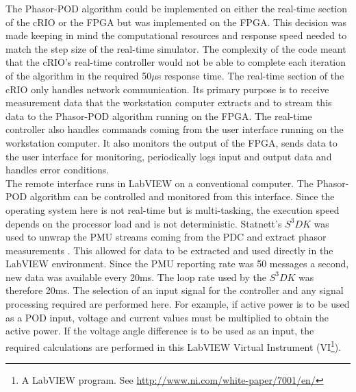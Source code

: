 \documentclass[journal]{IEEEtran}
\begin{document}
The Phasor-POD algorithm could be implemented on either the real-time section of the cRIO or the FPGA but was implemented on the FPGA. This decision was made keeping in mind the computational resources and response speed needed to match the step size of the real-time simulator. The complexity of the code meant that the cRIO\rq{s} real-time controller would not be able to complete each iteration of the algorithm in the required 50$\mu$s response time. The real-time section of the cRIO only handles network communication. Its primary purpose is to receive measurement data that the workstation computer extracts and to stream this data to the Phasor-POD algorithm running on the FPGA. The real-time controller also handles commands coming from the user interface running on the workstation computer.  It also monitors the output of the FPGA, sends data to the user interface for monitoring, periodically logs input and output data and handles error conditions.\\

The remote interface runs in LabVIEW on a conventional computer. The Phasor-POD algorithm can be controlled and monitored from this interface. Since the operating system here is not real-time but is multi-tasking, the execution speed depends on the processor load and is not deterministic. Statnett's $S^{3}DK$ was used to unwrap the PMU streams coming from the PDC and extract phasor measurements \cite{SDK}. This allowed for data to be extracted and used directly in the LabVIEW environment. Since the PMU reporting rate was 50 messages a second, new data was available every 20ms. The loop rate used by the $S^{3}DK$ was therefore 20ms. The selection of an input signal for the controller and any signal processing required are performed here. For example, if active power is to be used as a POD input, voltage and current values must be multiplied to obtain the active power. If the voltage angle difference is to be used as an input, the required calculations are performed in this LabVIEW Virtual Instrument (VI\footnote{A LabVIEW program. See \url{http://www.ni.com/white-paper/7001/en/}}).

\end{document}
